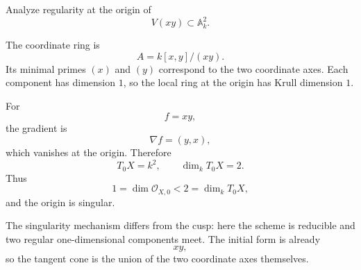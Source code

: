\begin{problem}\label{prob:vi32-09}
Analyze regularity at the origin of
\[
V(xy)\subset\mathbb A^2_k.
\]

\end{problem}

\ifdefined\FullProblemDossiers
\begin{solution}
The coordinate ring is
\[
A=k[x,y]/(xy).
\]
Its minimal primes \((x)\) and \((y)\) correspond to the two coordinate axes. Each component has dimension \(1\), so
the local ring at the origin has Krull dimension \(1\).

For
\[
f=xy,
\]
the gradient is
\[
\nabla f=(y,x),
\]
which vanishes at the origin. Therefore
\[
T_0X=k^2,
\qquad
\dim_kT_0X=2.
\]
Thus
\[
1=\dim\mathcal O_{X,0}<2=\dim_kT_0X,
\]
and the origin is singular.

The singularity mechanism differs from the cusp: here the scheme is reducible and two regular one-dimensional
components meet. The initial form is already
\[
xy,
\]
so the tangent cone is the union of the two coordinate axes themselves.
\end{solution}
\fi
